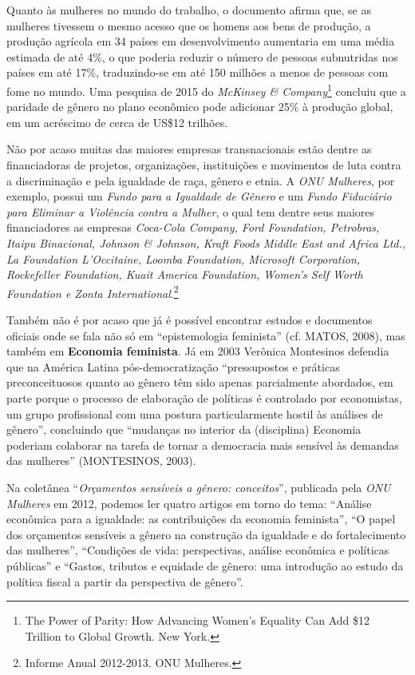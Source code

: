 Quanto às mulheres no mundo do trabalho, o documento afirma que, se as
mulheres tivessem o mesmo acesso que os homens aos bens de produção, a
produção agrícola em 34 países em desenvolvimento aumentaria em uma
média estimada de até 4\%, o que poderia reduzir o número de pessoas
subnutridas nos países em até 17\%, traduzindo-se em até 150 milhões a
menos de pessoas com fome no mundo. Uma pesquisa de 2015 do
\emph{McKinsey \& Company}\footnote{The Power of Parity: How Advancing
  Women's Equality Can Add \$12 Trillion to Global Growth. New York.}
concluiu que a paridade de gênero no plano econômico pode adicionar 25\%
à produção global, em um acréscimo de cerca de US\$12 trilhões.

Não por acaso muitas das maiores empresas transnacionais estão dentre as
financiadoras de projetos, organizações, instituições e movimentos de
luta contra a discriminação e pela igualdade de raça, gênero e etnia. A
\emph{ONU Mulheres}, por exemplo, possui um \emph{Fundo para a Igualdade
de Gênero} e um \emph{Fundo Fiduciário para Eliminar a Violência contra
a Mulher}, o qual tem dentre seus maiores financiadores as empresas
\emph{Coca-Cola Company, Ford Foundation, Petrobras, Itaipu Binacional,
Johnson \& Johnson, Kraft Foods Middle East and Africa Ltd., La
Foundation L'Occitaine, Loomba Foundation, Microsoft Corporation,
Rockefeller Foundation, Kuait America Foundation, Women's Self Worth
Foundation e Zonta International}.\footnote{Informe Anual 2012-2013. ONU
  Mulheres.}

Também não é por acaso que já é possível encontrar estudos e documentos
oficiais onde se fala não só em ``epistemologia feminista'' (cf. MATOS,
2008), mas também em \textbf{Economia feminista}. Já em 2003 Verônica
Montesinos defendia que na América Latina pós-democratização
``pressupostos e práticas preconceituosos quanto ao gênero têm sido
apenas parcialmente abordados, em parte porque o processo de elaboração
de políticas é controlado por economistas, um grupo profissional com uma
postura particularmente hostil às análises de gênero'', concluindo que
``mudanças no interior da (disciplina) Economia poderiam colaborar na
tarefa de tornar a democracia mais sensível às demandas das mulheres''
(MONTESINOS, 2003).

Na coletânea ``\emph{Orçamentos sensíveis a gênero: conceitos}'',
publicada pela \emph{ONU Mulheres} em 2012, podemos ler quatro artigos
em torno do tema: ``Análise econômica para a igualdade: as contribuições
da economia feminista'', ``O papel dos orçamentos sensíveis a gênero na
construção da igualdade e do fortalecimento das mulheres'', ``Condições
de vida: perspectivas, análise econômica e políticas públicas'' e
``Gastos, tributos e equidade de gênero: uma introdução ao estudo da
política fiscal a partir da perspectiva de gênero''.

